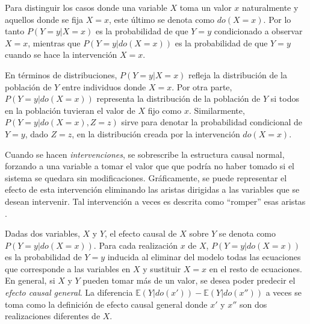 Para distinguir los casos donde una variable $X$ toma un valor $x$ naturalmente
y aquellos donde se fija $X = x$, este último se denota como $do(X=x)$.
Por lo tanto $P(Y=y|X=x)$ es la probabilidad de que $Y = y$ condicionado a 
observar $X=x$, mientras que $P(Y=y|do(X=x))$ es la  probabilidad de que $Y=y$
cuando se hace la intervención $X=x$.


En términos de distribuciones, $P(Y = y|X = x)$ refleja la distribución 
de la población de $Y$ entre individuos donde $X=x$.
Por otra parte, $P(Y = y|do(X = x))$ representa la distribución de
la población de $Y$ si todos en la población tuvieran el valor de $X$ fijo como
$x$.
Similarmente, $P(Y = y|do(X = x), Z = z)$ sirve para denotar
la probabilidad condicional de $Y = y$, dado $Z = z$, 
en la distribución creada por la intervención $do(X = x)$.

Cuando se hacen \textit{intervenciones},
se sobrescribe la estructura causal normal, forzando a una
variable a tomar el valor que que podría no haber tomado 
si el sistema se quedara sin modificaciones.
Gráficamente, se puede representar el
efecto de esta intervención eliminando las aristas 
dirigidas a las variables que se desean intervenir. Tal
intervención a veces es descrita como ``romper'' esas aristas \cite{sep-causal-models}.

Dadas dos variables, $X$ y $Y$,
el efecto causal de $X$ sobre $Y$ se denota como $P(Y=y|do(X=x))$. Para 
cada realización $x$ de $X$, $P(Y=y| do(X=x))$ es la probabilidad de $Y=y$ 
inducida al eliminar del modelo todas las ecuaciones que corresponde a las
variables en $X$ y sustituir $X=x$ en el resto de ecuaciones.
En general, si $X$ y $Y$ pueden tomar más de un valor, se desea poder
predecir el \textit{efecto causal general}.
La diferencia $\mathbb{E}(Y|do(x'))- \mathbb{E}(Y|do(x''))$ a veces
se toma como la definición de efecto causal general \cite{theoryofcausalities2006, pearl2016causal}
donde $x'$ y $x''$ son dos realizaciones diferentes de $X$.

